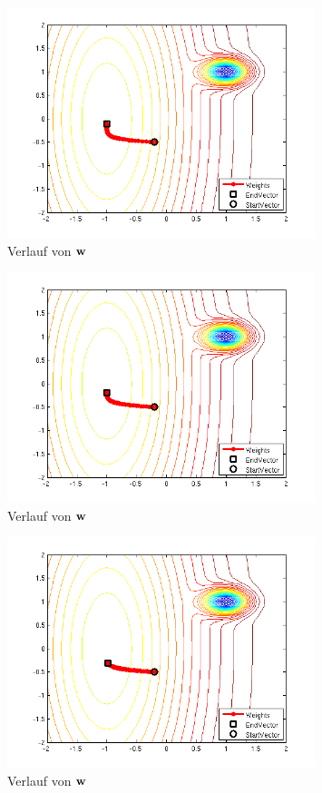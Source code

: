 \begin{figure}[h!]
  \centering
  \includegraphics[width=0.8\textwidth]{./figures/211/path_w02_eta015.png}
  \caption{Verlauf von $\mathbf{w}$}
  \label{fig:path_w02_eta015}
\end{figure}

\begin{figure}[h!]
  \centering
  \includegraphics[width=0.8\textwidth]{./figures/211/path_w02_eta01.png}
  \caption{Verlauf von $\mathbf{w}$}
  \label{fig:path_w02_eta01}
\end{figure}

\begin{figure}[h!]
  \centering
  \includegraphics[width=0.8\textwidth]{./figures/211/path_w02_eta005.png}
  \caption{Verlauf von $\mathbf{w}$}
  \label{fig:path_w02_eta005}
\end{figure}

